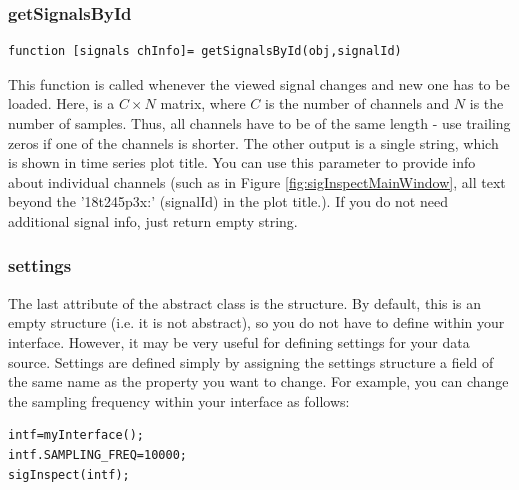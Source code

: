 \documentclass[a4paper,10pt]{article}
\begin{document}
\subsubsection{getSignalsById}
\begin{lstlisting}
function [signals chInfo]= getSignalsById(obj,signalId)
\end{lstlisting}
This function is called whenever the viewed signal changes and new one has to be loaded. Here,  is a $C \times N$ matrix, where $C$ is the number of channels and $N$ is the number of samples. Thus, all channels have to be of the same length - use trailing zeros if one of the channels is shorter. The other output  is a single string, which is shown in time series plot title. You can use this parameter to provide info about individual channels (such as in Figure \ref{fig:sigInspectMainWindow}, all text beyond the '18t245p3x:' (signalId) in the plot title.). If you do not need additional signal info, just return empty string.

\subsubsection{settings}
The last attribute of the abstract class is the  structure. By default, this is an empty structure (i.e. it is not abstract), so you do not have to define within your interface. However, it may be very useful for defining settings for your data source. Settings are defined simply by assigning the settings structure a field of the same name as the property you want to change. For example, you can change the sampling frequency within your interface as follows:

\begin{lstlisting}
intf=myInterface();
intf.SAMPLING_FREQ=10000;
sigInspect(intf);
\end{lstlisting}

\newpage
\end{document}
